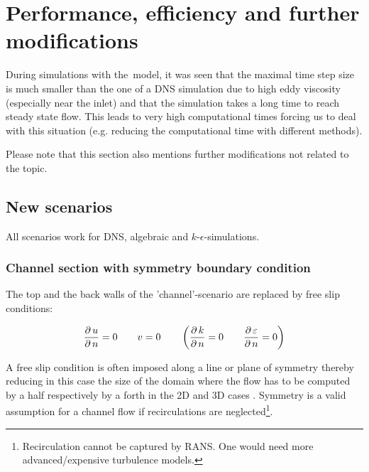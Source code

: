 \chapter{Performance, efficiency and further modifications} %
\label{cha:performance_efficiency_and_further_modifications}

During simulations with the \ke\,model, it was seen that the maximal time step size is much smaller than the one of a DNS simulation due to high eddy viscosity (especially near the inlet) and that the simulation takes a long time to reach steady state flow. This leads to very high computational times forcing us to deal with this situation (e.g. reducing the computational time with different methods).

\noii Please note that this section also mentions further modifications not related to the topic.
 
\section{New scenarios} %
\label{sec:new_scenarios}

All scenarios work for DNS, algebraic and $k$-$\epsilon$-simulations.



\subsection*{Channel section with symmetry boundary condition} %
\label{sub:channel_section_with_symmetry_boundary_condition}

The top and the back walls of the 'channel'-scenario are replaced by free slip conditions:

\begin{equation}
\frac{\partial\,u}{\partial\,n}=0
\qquad
v = 0
\qquad
\left(
\frac{\partial\,k}{\partial\,n}=0
\qquad
\frac{\partial\,\varepsilon}{\partial\,n}=0
\right)
\end{equation}  

\noii A free slip condition is often imposed along a line or plane of symmetry  thereby reducing in this case the size of the domain where the flow has to be computed by a half respectively by a forth in the 2D and 3D cases \citep{griebel1998}. Symmetry is a valid assumption for a channel flow if recirculations are neglected\footnote{Recirculation cannot be captured by RANS. One would need more advanced/expensive turbulence models.}.

